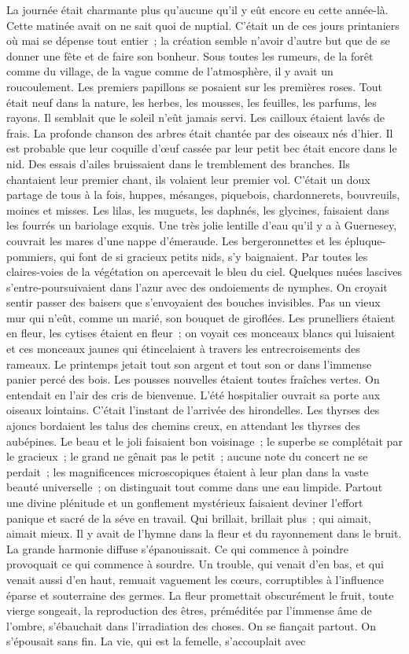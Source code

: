 \documentclass[french,twoside]{book} %
\begin{document}
La journée était charmante plus qu’aucune qu’il y eût encore eu cette année-là. Cette matinée avait on ne sait quoi de nuptial. C’était un de ces jours printaniers où mai se dépense tout entier ; la création semble n’avoir d’autre but que de se donner une fête et de faire son bonheur. Sous toutes les rumeurs, de la forêt comme du village, de la vague comme de l’atmosphère, il y avait un roucoulement. Les premiers papillons se posaient sur les premières roses. Tout était neuf dans la nature, les herbes, les mousses, les feuilles, les parfums, les rayons. Il semblait que le soleil n’eût jamais servi. Les cailloux étaient lavés de frais. La profonde chanson des arbres était chantée par des oiseaux nés d’hier. Il est probable que leur coquille d’œuf cassée par leur petit bec était encore dans le nid. Des essais d’ailes bruissaient dans le tremblement des branches. Ils chantaient leur premier chant, ils volaient leur premier vol. C’était un doux partage de tous à la fois, huppes, mésanges, piquebois, chardonnerets, bouvreuils, moines et misses. Les lilas, les muguets, les  daphnés, les glycines, faisaient dans les fourrés un bariolage exquis. Une très jolie lentille d’eau qu’il y a à Guernesey, couvrait les mares d’une nappe d’émeraude. Les bergeronnettes et les épluque-pommiers, qui font de si gracieux petits nids, s’y baignaient. Par toutes les claires-voies de la végétation on apercevait le bleu du ciel. Quelques nuées lascives s’entre-poursuivaient dans l’azur avec des ondoiements de nymphes. On croyait sentir passer des baisers que s’envoyaient des bouches invisibles. Pas un vieux mur qui n’eût, comme un marié, son bouquet de giroflées. Les prunelliers étaient en fleur, les cytises étaient en fleur ; on voyait ces monceaux blancs qui luisaient et ces monceaux jaunes qui étincelaient à travers les entrecroisements des rameaux. Le printemps jetait tout son argent et tout son or dans l’immense panier percé des bois. Les pousses nouvelles étaient toutes fraîches vertes. On entendait en l’air des cris de bienvenue. L’été hospitalier ouvrait sa porte aux oiseaux lointains. C’était l’instant de l’arrivée des hirondelles. Les thyrses des ajoncs bordaient les talus des chemins creux, en attendant les thyrses des aubépines. Le beau et le joli faisaient bon voisinage ; le superbe se complétait par le gracieux ; le grand ne gênait pas le petit ; aucune note du concert ne se perdait ; les magnificences microscopiques étaient à leur plan dans la vaste beauté universelle ; on distinguait tout comme dans une eau limpide. Partout une divine plénitude et un gonflement mystérieux faisaient deviner l’effort panique et sacré de la séve en travail. Qui brillait, brillait plus ; qui  aimait, aimait mieux. Il y avait de l’hymne dans la fleur et du rayonnement dans le bruit. La grande harmonie diffuse s’épanouissait. Ce qui commence à poindre provoquait ce qui commence à sourdre. Un trouble, qui venait d’en bas, et qui venait aussi d’en haut, remuait vaguement les cœurs, corruptibles à l’influence éparse et souterraine des germes. La fleur promettait obscurément le fruit, toute vierge songeait, la reproduction des êtres, préméditée par l’immense âme de l’ombre, s’ébauchait dans l’irradiation des choses. On se fiançait partout. On s’épousait sans fin. La vie, qui est la femelle, s’accouplait avec 
\end{document}
